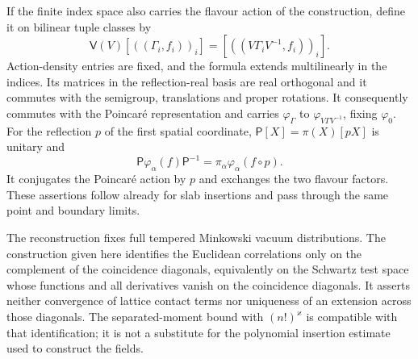 \documentclass[11pt,letterpaper,reqno]{amsart}
\theoremstyle{definition}
\theoremstyle{remark}
\begin{document}
If the finite index space also carries the flavour action
of the construction, define it on bilinear tuple classes by
\[
 \mathsf V(V)[((\Gamma_i,f_i))_i]
              =[((V\Gamma_iV^{-1},f_i))_i].
\]
Action-density entries are fixed, and the formula extends
multilinearly in the indices. Its matrices in the
reflection-real basis are real orthogonal and it
commutes with the semigroup, translations and proper
rotations.  It consequently commutes with the
Poincar\'e representation and carries
$\varphi_\Gamma$ to $\varphi_{V\Gamma V^{-1}}$,
fixing $\varphi_0$.  For the reflection $p$ of the
first spatial coordinate,
$\mathsf P[X]=\pi(X)[pX]$ is unitary and
\[
 \mathsf P\varphi_\alpha(f)\mathsf P^{-1}
          =\pi_\alpha\varphi_\alpha(f\circ p).
\]
It conjugates the Poincar\'e action by $p$ and
exchanges the two flavour factors.  These assertions
follow already for slab insertions and pass through
the same point and boundary limits.

The reconstruction fixes full tempered Minkowski
vacuum distributions.  The construction given here
identifies the Euclidean correlations only on the
complement of the coincidence diagonals, equivalently
on the Schwartz test space whose functions and all derivatives
vanish on the coincidence diagonals. It
asserts neither convergence of lattice contact terms
nor uniqueness of an extension across those diagonals.
The separated-moment bound with $(n!)^\varkappa$ is
compatible with that identification; it is not a
substitute for the polynomial insertion estimate used
to construct the fields.
\end{document}

